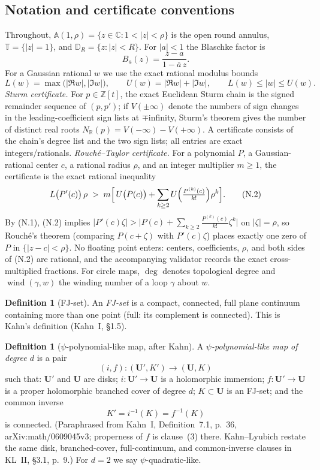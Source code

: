 \documentclass[11pt,reqno]{amsart}
\theoremstyle{definition}
\newtheorem{definition}[theorem]{Definition}
\theoremstyle{remark}
\begin{document}
\subsection*{Notation and certificate conventions}
Throughout, \(\mathbb A(1,\rho)=\{z\in\mathbb C:1<|z|<\rho\}\) is the open round annulus, \(\mathbb T=\{|z|=1\}\), and \(\mathbb D_R=\{z:|z|<R\}\). For \(|a|<1\) the Blaschke factor is
\[ B_a(z)=\frac{z-a}{1-\overline a\,z}. \]
For a Gaussian rational \(w\) we use the exact rational modulus bounds
\[ L(w)=\max\bigl(|\Re w|,|\Im w|\bigr),\qquad U(w)=|\Re w|+|\Im w|,\qquad L(w)\le|w|\le U(w). \tag{N.1} \]
\emph{Sturm certificate.} For \(p\in\mathbb Z[t]\), the exact Euclidean Sturm chain is the signed remainder sequence of \((p,p')\); if \(V(\pm\infty)\) denote the numbers of sign changes in the leading-coefficient sign lists at \(\mp\)infinity, Sturm's theorem gives the number of distinct real roots \(N_{\mathbb R}(p)=V(-\infty)-V(+\infty)\). A certificate consists of the chain's degree list and the two sign lists; all entries are exact integers/rationals.
\emph{Rouch\'e--Taylor certificate.} For a polynomial \(P\), a Gaussian-rational center \(c\), a rational radius \(\rho\), and an integer multiplier \(m\ge1\), the certificate is the exact rational inequality
\[ L\bigl(P'(c)\bigr)\,\rho\;>\;m\Bigl[\,U\bigl(P(c)\bigr)+\sum_{k\ge2}U\Bigl(\tfrac{P^{(k)}(c)}{k!}\Bigr)\rho^{k}\Bigr]. \tag{N.2} \]
By (N.1), (N.2) implies \(|P'(c)\zeta|>\bigl|P(c)+\sum_{k\ge2}\tfrac{P^{(k)}(c)}{k!}\zeta^{k}\bigr|\) on \(|\zeta|=\rho\), so Rouch\'e's theorem (comparing \(P(c+\zeta)\) with \(P'(c)\zeta\)) places exactly one zero of \(P\) in \(\{|z-c|<\rho\}\). No floating point enters: centers, coefficients, \(\rho\), and both sides of (N.2) are rational, and the accompanying validator records the exact cross-multiplied fractions.
For circle maps, \(\deg\) denotes topological degree and \(\operatorname{wind}(\gamma,w)\) the winding number of a loop \(\gamma\) about \(w\).
\begin{definition}[FJ-set]\label{def:fj}
An \emph{FJ-set} is a compact, connected, full plane continuum containing more than one point (full: its complement is connected). This is Kahn's definition (Kahn~I, \S1.5).
\end{definition}

\begin{definition}[\(\psi\)-polynomial-like map, after Kahn]\label{def:psiql}
A \emph{\(\psi\)-polynomial-like map of degree \(d\)} is a pair
\[ (i,f):(\mathbf U',K')\longrightarrow(\mathbf U,K) \]
such that: \(\mathbf U'\) and \(\mathbf U\) are disks; \(i:\mathbf U'\to\mathbf U\) is a holomorphic immersion; \(f:\mathbf U'\to\mathbf U\) is a proper holomorphic branched cover of degree \(d\); \(K\subset\mathbf U\) is an FJ-set; and the common inverse
\[ K'=i^{-1}(K)=f^{-1}(K) \]
is connected. (Paraphrased from Kahn~I, Definition~7.1, p.~36, arXiv:math/0609045v3; properness of \(f\) is clause~(3) there.  Kahn--Lyubich restate the same disk, branched-cover, full-continuum, and common-inverse clauses in KL~II, \S3.1, p.~9.) For \(d=2\) we say \(\psi\)-quadratic-like.
\end{definition}
\end{document}
